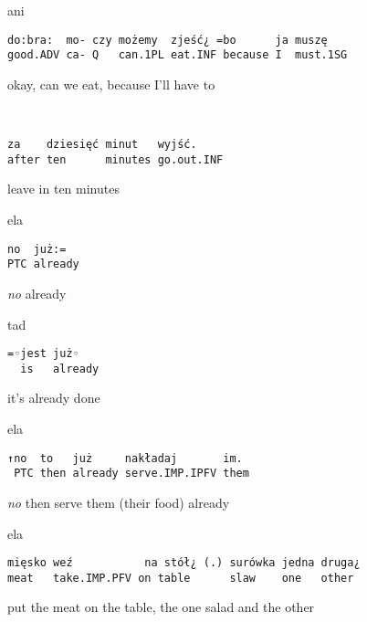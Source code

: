 \documentclass[output=paper]{langsci/langscibook}
\begin{document}
\newpage
{}\vspace{2mm}
%
\begin{transbox}{1}{ani}
\begin{verbatim}
do:bra:  mo- czy możemy  zjeść¿ =bo      ja muszę
good.ADV ca- Q   can.1PL eat.INF because I  must.1SG
\end{verbatim}
okay, can we eat, because I’ll have to
\end{transbox}
%
\begin{transbox}{2}{~}
\begin{verbatim}
za    dziesięć minut   wyjść.
after ten      minutes go.out.INF
\end{verbatim}
leave in ten minutes
\end{transbox}
%
\begin{transbox}{3}{ela}
\begin{verbatim}
no  już:=
PTC already
\end{verbatim}
\textit{no} already
\end{transbox}
%
\begin{transbox}{4}{tad}
\begin{verbatim}
=◦jest już◦
  is   already
\end{verbatim}
\hspace{0.2cm} it’s already done
\end{transbox}
%
\begin{mdframednoverticalspace}[style=firstfoc]
\begin{transbox}{5}{ela}
\begin{verbatim}
↑no  to   już     nakładaj       im.
 PTC then already serve.IMP.IPFV them
\end{verbatim}
\hspace{0.07cm} \textit{no} then serve them (their food) already
\end{transbox}
\end{mdframednoverticalspace}
%
%
\begin{mdframednoverticalspace}[style=firstfoc]
\begin{transbox}{7}{ela}
\begin{verbatim}
mięsko weź           na stół¿ (.) surówka jedna druga¿
meat   take.IMP.PFV on table      slaw    one   other
\end{verbatim}
put the meat on the table, the one salad and the other
\end{transbox}
\end{mdframednoverticalspace}
%
\begin{mdframednoverticalspace}[style=secondfoc]
\end{mdframednoverticalspace}
\end{document}
